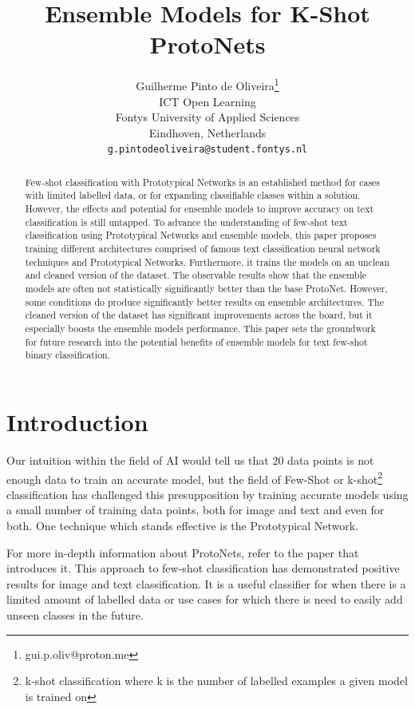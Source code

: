 \documentclass{article}
\title{Ensemble Models for K-Shot ProtoNets}
\author{%
  Guilherme Pinto de Oliveira\thanks{gui.p.oliv@proton.me}\\
  ICT Open Learning\\
  Fontys University of Applied Sciences\\
  Eindhoven, Netherlands \\
  \texttt{g.pintodeoliveira@student.fontys.nl} \\
}
\begin{document}
\maketitle


\begin{abstract}
  Few-shot classification with Prototypical Networks is an established method for cases with limited labelled data, or for expanding classifiable classes within a solution. However, the effects and potential for ensemble models to improve accuracy on text classification is still untapped.
  To advance the understanding of few-shot text classification using Prototypical Networks and ensemble models, this paper proposes training different architectures comprised of famous text classification neural network techniques and Prototypical Networks. Furthermore, it trains the models on an unclean and cleaned version of the dataset.
  The observable results show that the ensemble models are often not statistically significantly better than the base ProtoNet. However, some conditions do produce significantly better results on ensemble architectures.
  The cleaned version of the dataset has significant improvements across the board, but it especially boosts the ensemble models performance.
  This paper sets the groundwork for future research into the potential benefits of ensemble models for text few-shot binary classification. 
\end{abstract}

\section{Introduction}
  Our intuition within the field of AI would tell us that 20 data points is not enough data to train an accurate model, but the field of Few-Shot or k-shot\footnote{k-shot classification where k is the number of labelled examples a given model is trained on} classification has challenged this presupposition by training accurate models using a small number of training data points, both for image\cite{NIPS2017_cb8da676, hou2022closerlookprototypeclassifier, JI202081} and text\cite{sun-etal-2019-hierarchical, electronics11152423, Sourati2023-bq, Liu2025-gf} and even for both\cite{Pahde_2021_WACV}.
  One technique which stands effective is the Prototypical Network.

  For more in-depth information about ProtoNets, refer to the paper that introduces it\cite{NIPS2017_cb8da676}.
  This approach to few-shot classification has demonstrated positive results for image\cite{NIPS2017_cb8da676,hou2022closerlookprototypeclassifier, JI202081} and text classification\cite{sun-etal-2019-hierarchical,electronics11152423,Sourati2023-bq,Liu2025-gf}. It is a useful classifier for when there is a limited amount of labelled data or use cases for which there is need to easily add unseen classes in the future.
\end{document}
